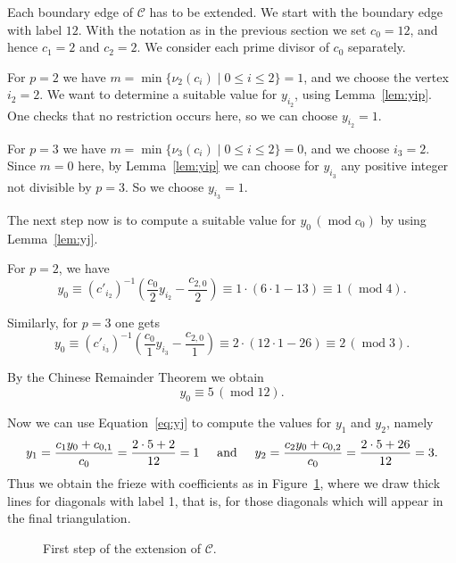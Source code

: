 \documentclass[ALCO,ThmDefs,Unicode,epreuves,published]{cedram}
\numberwithin{equation}{section}
\DeclareMathOperator{\md}{mod}
\begin{document}
Each boundary edge of $\mathcal{C}$ has to be extended. We start with the boundary edge
with label $12$. With the notation as in the previous section we set $c_0=12$, and hence
$c_1=2$ and $c_2=2$. We consider each prime divisor of $c_0$ separately. 

For $p=2$ we have $m=\min\{\nu_2(c_i)\mid 0\le i\le 2\}=1$, and we choose the vertex
$i_2=2$.
We want to determine a suitable value for $y_{i_2}$, using Lemma~\ref{lem:yip}.
One checks that no restriction occurs here, so we can choose 
$y_{i_2}=1$.


For $p=3$ we have $m=\min\{\nu_3(c_i)\mid 0\le i\le 2\}=0$, and we choose $i_3=2$. Since $m=0$ here, by Lemma~\ref{lem:yip}
we can choose for $y_{i_3}$
any positive integer not divisible by $p=3$. 
So we choose 
$y_{i_3}=1$.

The next step now is to compute a suitable value for 
$y_{0}\,(\md c_0)$ by using
Lemma~\ref{lem:yj}.

For $p=2$, we have
\[
y_0 \equiv (c'_{i_2})^{-1} \left( \frac{c_0}{2} y_{i_2} - \frac{c_{2,0}}{2}\right)
\equiv 1\cdot (6\cdot 1 - 13) \equiv 1 \,(\md 4).
\]

Similarly, for $p=3$ one gets
\[
y_0 \equiv (c'_{i_3})^{-1} \left( \frac{c_0}{1} y_{i_3} - \frac{c_{2,0}}{1}\right)
\equiv 2\cdot (12\cdot 1 - 26) \equiv 2 \,(\md 3).
\]

By the Chinese Remainder Theorem we obtain
\[
y_{0}\equiv 5 \,(\md 12).
\]

Now we can use Equation~\eqref{eq:yj} to compute the values for $y_1$ and $y_2$, namely
\[
y_1=\frac{c_1y_0+c_{0,1}}{c_0} = \frac{2\cdot 5 +2}{12} = 1\hskip0.5cm
\mbox{and}\hskip0.5cm
y_2=\frac{c_2y_0+c_{0,2}}{c_0} = \frac{2\cdot 5 +26}{12} = 3.
\]
Thus we obtain the frieze with coefficients as in Figure~\ref{fig:fwcext1}, where we
draw thick lines for diagonals with label 1, that is, for those diagonals which will
appear in the final triangulation. 



\begin{figure}[htb]\centering
{}

\vspace{-3mm}
 \caption{First step of the extension of $\mathcal{C}$.
 \label{fig:fwcext1}}
\end{figure}
\end{document}

